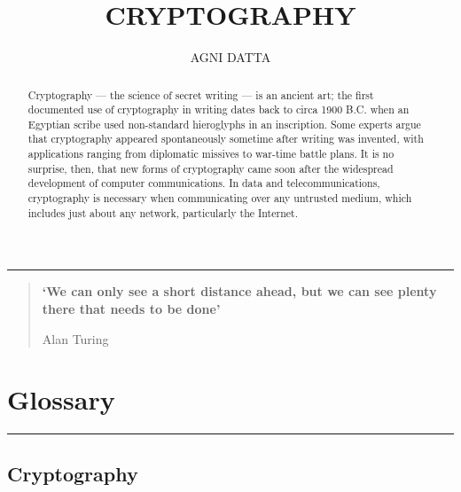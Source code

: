 \documentclass[british]{article}
\begin{document}
\title{\textbf{\Huge{}CRYPTOGRAPHY}}
\author{AGNI DATTA}
\maketitle
\begin{center}
\rule[0.5ex]{0.5\columnwidth}{0.75pt} 
\par\end{center}
\begin{quotation}
\begin{center}
\textbf{`We can only see a short distance ahead, but we can see plenty
there that needs to be done'} 
\par\end{center}
\begin{center}
Alan Turing 
\par\end{center}

\end{quotation}
\medskip{}

\begin{abstract}
{\normalsize{}Cryptography --- the science of secret writing ---
is an ancient art; the first documented use of cryptography in writing
dates back to circa 1900 B.C. when an Egyptian scribe used non-standard
hieroglyphs in an inscription. Some experts argue that cryptography
appeared spontaneously sometime after writing was invented, with applications
ranging from diplomatic missives to war-time battle plans. It is no
surprise, then, that new forms of cryptography came soon after the
widespread development of computer communications. In data and telecommunications,
cryptography is necessary when communicating over any untrusted medium,
which includes just about any network, particularly the Internet.}{\normalsize\par}

 
\end{abstract}
\pagebreak{}

\tableofcontents{}

\vfill{}

\pagebreak{}

\section{Glossary}
\begin{center}
\rule[0.5ex]{450bp}{0.75pt} 
\par\end{center}

\subsection{Cryptography}
\end{document}
